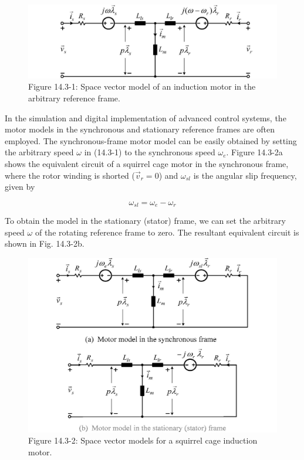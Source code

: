\documentclass[letterpaper,12pt]{article}
\begin{document}
\begin{figure}[h]
\centering
\includegraphics{graficos/img03.jpg}
\caption{Figure 14.3-1: Space vector model of an induction motor in the arbitrary reference frame.}
\end{figure}
\FloatBarrier

In the simulation and digital implementation of advanced control systems, the motor models in the synchronous and stationary reference frames are often employed. The synchronous-frame motor model can be easily obtained by setting the arbitrary speed $\omega$ in (14.3-1) to the synchronous speed $\omega_e$. Figure 14.3-2a shows the equivalent circuit of a squirrel cage motor in the synchronous frame, where the rotor winding is shorted ($\vec{v}_r = 0$) and $\omega_{sl}$ is the angular slip frequency, given by

\begin{equation}
\omega_{sl} = \omega_e - \omega_r \tag{14.3-4}
\end{equation}

To obtain the model in the stationary (stator) frame, we can set the arbitrary speed $\omega$ of the rotating reference frame to zero. The resultant equivalent circuit is shown in Fig. 14.3-2b.

\begin{figure}[h]
\centering
\includegraphics{graficos/img04.jpg}
\caption{Figure 14.3-2: Space vector models for a squirrel cage induction motor.}
\end{figure}
\FloatBarrier
\end{document}
